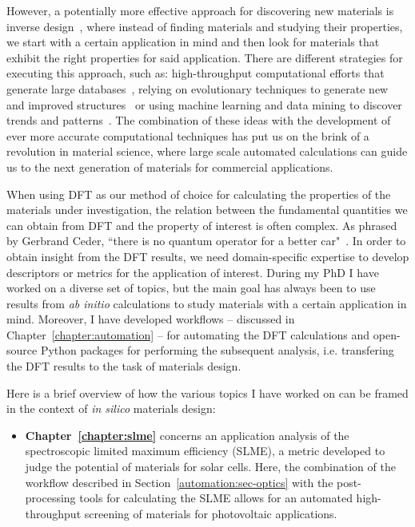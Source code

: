 \begin{refsection}
However, a potentially more effective approach for discovering new materials is 
inverse design~\cite{Zunger2018}, where instead of finding materials and studying 
their properties, we start with a certain application in mind and then look for 
materials that exhibit the right properties for said application. There are 
different strategies for executing this approach, such as: high-throughput 
computational efforts that generate large databases~\cite{Curtarolo2013, Jain2011}, 
relying on evolutionary techniques to generate new and improved 
structures~\cite{Oganov2018} or using machine learning and data mining to discover 
trends and patterns~\cite{Draxl2019}. The combination of these ideas with the 
development of ever more accurate computational techniques has put us on the brink of a revolution in material science, where large scale automated calculations can guide us to the next generation of materials for commercial applications.

When using DFT as our method of choice for calculating the properties of the materials under investigation, the relation between the fundamental quantities we can obtain from DFT and the property of interest is often complex. As phrased by Gerbrand Ceder, ``there is no quantum operator for a better car"~\cite{Ceder2010}. In order to obtain insight from the DFT results, we need domain-specific expertise to develop descriptors or metrics for the application of interest. During my PhD I have worked on a diverse set of topics, but the main goal has always been to use results from \textit{ab initio} calculations to study materials with a certain application in mind. Moreover, I have developed workflows -- discussed in Chapter~\ref{chapter:automation} -- for automating the DFT calculations and open-source Python packages for performing the subsequent analysis, i.e. transfering the DFT results to the task of materials design. 

Here is a brief overview of how the various topics I have worked on can be framed in the context of \textit{in silico} materials design:

\begin{itemize}[]

\item \textbf{Chapter~\ref{chapter:slme}} concerns an application analysis of the spectroscopic limited maximum efficiency (SLME), a metric developed to judge the potential of materials for solar cells. Here, the combination of the workflow described in Section~\ref{automation:sec-optics} with the post-processing tools for calculating the SLME allows for an automated high-throughput screening of materials for photovoltaic applications.


\end{itemize}
\end{refsection}
